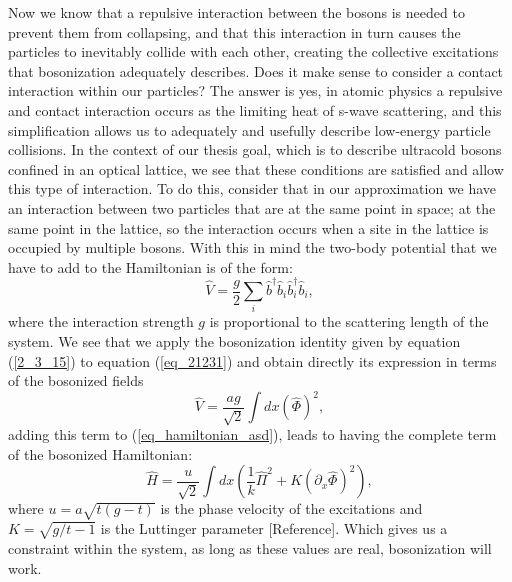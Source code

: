 Now we know that a repulsive interaction between the bosons is needed to prevent them from collapsing, and that this interaction in turn causes the particles to inevitably collide with each other, creating the collective excitations that bosonization adequately describes. Does it make sense to consider a contact interaction within our particles? The answer is yes, in atomic physics a repulsive and contact interaction occurs as the limiting heat of s-wave scattering, and this simplification allows us to adequately and usefully describe low-energy particle collisions. In the context of our thesis goal, which is to describe ultracold bosons confined in an optical lattice, we see that these conditions are satisfied and allow this type of interaction. To do this, consider that in our approximation we have an interaction between two particles that are at the same point in space; at the same point in the lattice, so the interaction occurs when a site in the lattice is occupied by multiple bosons. With this in mind the two-body potential that we have to add to the Hamiltonian is of the form:
\begin{equation} \label{eq_21231}
    \hat{V} =\frac{g}{2} \sum_{i} \hat{b}^{\dagger}_{}\hat{b}^{}_{i}\hat{b}^{\dagger}_{i}\hat{b}^{}_{i},
\end{equation}
where the interaction strength $g$ is proportional to the scattering length of the system. We see that we apply the bosonization identity given by equation (\ref{2_3_15}) to equation (\ref{eq_21231}) and obtain directly its expression in terms of the bosonized fields
\begin{equation}
    \hat{V} = \frac{ag}{\sqrt{2}} \int dx \left( \hat{\Phi}\right)^{2},
\end{equation}
adding this term to (\ref{eq_hamiltonian_asd}), leads to having the complete term of the bosonized Hamiltonian:
\begin{equation} \label{hamiltonian2}
    \hat{H} = \frac{u}{\sqrt{2}} \int dx \left( \frac{1}{k}   \hat{\Pi}^{2} + K\left(\partial_{x} \hat{\Phi}\right)^{2} \right), 
\end{equation}
where $u = a \sqrt{t(g-t)} $ is the phase velocity of the excitations and $K = \sqrt{g/t -1}$ is the Luttinger parameter [Reference]. Which gives us a constraint within the system, as long as these values are real, bosonization will work.\\ \\

